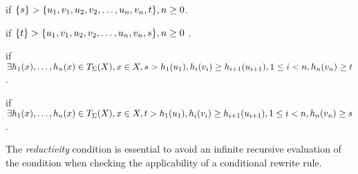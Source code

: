 \begin{CRule}

if $\set{s} \TO> \set{u_1, v_1, u_2, v_2, \ldots, u_n , v_n, t} , n \geq 0 $.


if $\set{t} \TO> \set{u_1, v_1, u_2, v_2, \ldots, u_n, v_n, s}, n \geq 0$ .
\end{CRule} \bigskip

\begin{CRule}

if $\exists h_1(x),\ldots,h_n(x) \in T_\Sigma(X), x \in X, 
 s \TO> h_1(u_1), h_i(v_i) \geq h_{i+1}(u_{i+1}), 1 \leq i < n,
 h_n(v_n) \geq t$.


if $\exists h_1(x),\ldots,h_n(x) \in T_\Sigma(X), x \in X,  
 t \TO> h_1(u_1), h_i(v_i) \geq h_{i+1}(u_{i+1}), 1 \leq i < n,
 h_n(v_n) \geq s$.
\end{CRule}
\vspace{1.5ex}

\noindent
The {\em reductivity} condition is essential to avoid an infinite recursive evaluation of the
condition when checking the applicability of a conditional rewrite rule.\bigskip

